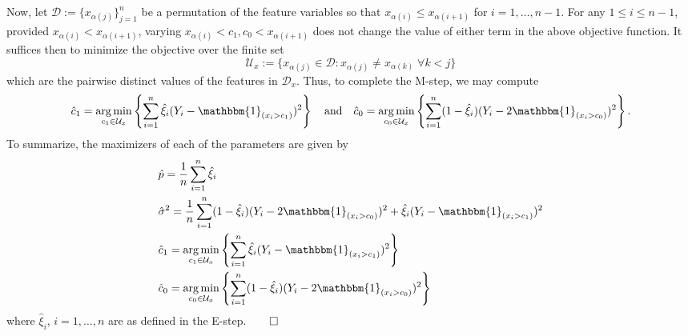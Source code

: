 \documentclass[10pt]{article}
\newcommand{\1}[1]{\mathbbm{1}_{#1}}
\newcommand{\mc}[1]{\mathcal{#1}}
\DeclareMathOperator{\argmin}{arg\,min}
\begin{document}
Now, let $\mc{D}:=\{x_{\alpha(j)}\}_{j=1}^n$ be a permutation of the feature variables so that $x_{\alpha(i)}\leq x_{\alpha(i+1)}$ for $i=1,\dots,n-1$. For any $1\leq i\leq n-1$, provided $x_{\alpha(i)}<x_{\alpha(i+1)}$, varying $x_{\alpha(i)}<c_1,c_0<x_{\alpha(i+1)}$ does not change the value of either term in the above objective function. It suffices then to minimize the objective over the finite set
\[\mc{U}_x:=\{x_{\alpha(j)}\in\mc{D}:x_{\alpha(j)}\neq x_{\alpha(k)}\;\forall k<j\}\]
which are the pairwise distinct values of the features in $\mc{D}_x$. Thus, to complete the M-step, we may compute
\begin{align*}
    \hat{c}_1=\argmin_{c_1\in\mc{U}_x}\left\{\sum_{i=1}^n\hat{\xi}_i(Y_i-\mathbbm{1}_{(x_i>c_1)})^2\right\}\quad\text{and}\quad\hat{c}_0=\argmin_{c_0\in\mc{U}_x}\left\{\sum_{i=1}^n(1-\hat{\xi}_i)(Y_i-2\mathbbm{1}_{(x_i>c_0)})^2\right\}.
\end{align*}
To summarize, the maximizers of each of the parameters are given by
\begin{align*}
    &\hat{p}=\frac{1}{n}\sum_{i=1}^n\hat{\xi}_i\\
    &\hat{\sigma}^2=\frac{1}{n}\sum_{i=1}^n(1-\hat{\xi}_i)(Y_i-2\mathbbm{1}_{(x_i>c_0)})^2+\hat{\xi}_i(Y_i-\mathbbm{1}_{(x_i>c_1)})^2\\
    &\hat{c}_1=\argmin_{c_1\in\mc{U}_x}\left\{\sum_{i=1}^n\hat{\xi}_i(Y_i-\mathbbm{1}_{(x_i>c_1)})^2\right\}\\
    &\hat{c}_0=\argmin_{c_0\in\mc{U}_x}\left\{\sum_{i=1}^n(1-\hat{\xi}_i)(Y_i-2\mathbbm{1}_{(x_i>c_0)})^2\right\}
\end{align*}
where $\hat{\xi}_i$, $i=1,\dots,n$ are as defined in the E-step.\hfill{$\qed$}
\end{document}
